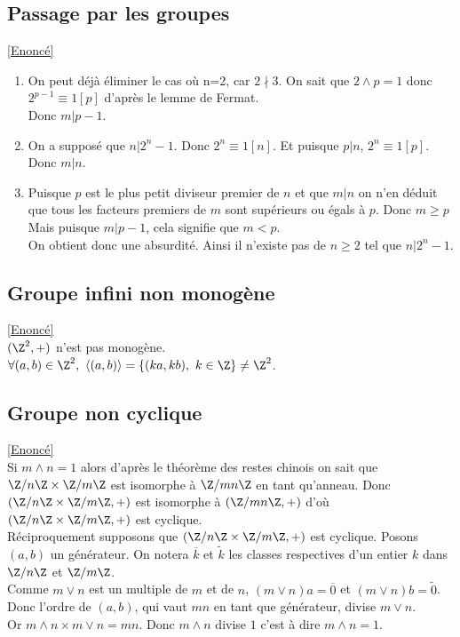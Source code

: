 \documentclass[8pt]{book}
\begin{document}
	\subsection{Passage par les groupes }
	\label{Passage par les groupes corrigé}
	\textcolor{blue}{\hyperref[Passage par les groupes]{[Enoncé]}}\\
	\begin{enumerate}
		\item On peut déjà éliminer le cas où n=2, car $2\nmid3$. On sait que $2\wedge p=1$ donc $2^{p-1}\equiv 1[p]$ d'après le lemme de Fermat.\\ Donc $m|p-1$.
		\item On a supposé que $n|2^n-1.$ Donc $2^n\equiv 1[n]$. Et puisque $p|n$, $2^n\equiv1[p]$. Donc $m|n$.
		\item Puisque $p$ est le plus petit diviseur premier de $n$ et que $m|n$ on n'en déduit que tous les facteurs premiers de $m$ sont supérieurs ou égals à $p$. Donc $m\geq p$\\
		Mais puisque $m|p-1$, cela signifie que $m<p$.\\
		On obtient donc une absurdité. Ainsi il n'existe pas de $n\geq 2$ tel que $n|2^n -1$. 
	\end{enumerate}
	
	\subsection{Groupe infini non monogène }
	\label{Groupe infini non monogène corrigé}
	\textcolor{blue}{\hyperref[Groupe infini non monogène]{[Enoncé]}}\\
	$(\Z^2,+)$ n'est pas monogène.\\
	$\forall (a,b)\in \Z^2,\ \langle (a,b)\rangle=\{(ka,kb),\ k\in \Z\}\ne \Z^2$.
	
	\subsection{Groupe non cyclique }
	\label{Groupe non cyclique corrigé}
	\textcolor{blue}{\hyperref[Groupe non cyclique]{[Enoncé]}}\\
	Si $m\land n=1$ alors d'après le théorème des restes chinois on sait que $\Z/n\Z\times\Z/m\Z$ est isomorphe à $\Z/mn\Z$ en tant qu'anneau. Donc $(\Z/n\Z\times\Z/m\Z,+)$ est isomorphe à $(\Z/mn\Z,+)$ d'où $(\Z/n\Z\times\Z/m\Z,+)$ est cyclique.\\
	Réciproquement supposons que $(\Z/n\Z\times\Z/m\Z,+)$ est cyclique. Posons $(a,b)$ un générateur. On notera $\overline k$ et $\tilde k$ les classes respectives d'un entier $k$ dans $\Z/n\Z$ et $\Z/m\Z$.\\
	Comme $m\vee n$ est un multiple de $m$ et de $n$, $(m\vee n)a=\overline{0}$ et $(m\vee n)b=\tilde 0$. Donc l'ordre de $(a,b)$, qui vaut $mn$ en tant que générateur, divise $m\vee n$.\\
	Or $m\wedge n\times m\vee n=mn$. Donc $m\wedge n$ divise $1$ c'est à dire $m\wedge n=1$.
	
\end{document}
